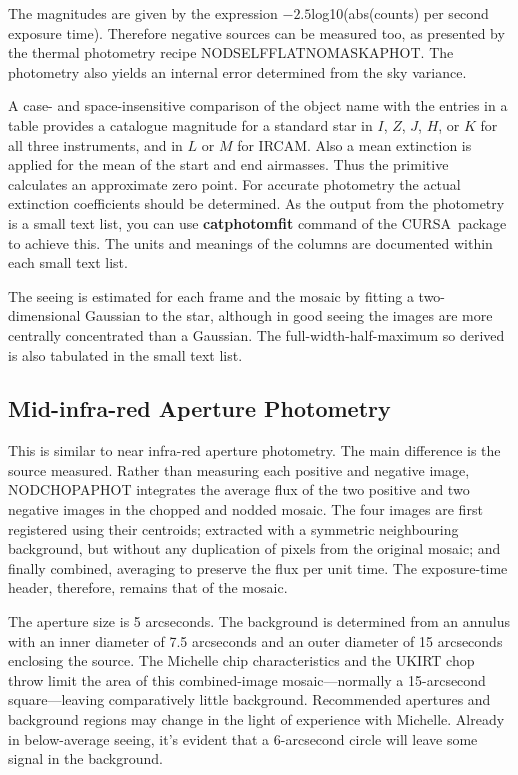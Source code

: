 \documentclass[twoside,11pt]{article}
\newcommand{\htmlref}[2]{#1}
\newcommand{\xref}[3]{#1}
\newcommand{\xlabel}[1]{}
\renewcommand{\_}{\texttt{\symbol{95}}}
\newcommand{\lsk}{\raisebox{-0.4ex}{\rm *}}
\newcommand{\CURSA}{{\footnotesize CURSA}}
\begin{document}
The magnitudes are given by the expression $-2.5 $\lsk$
$log10(abs(counts) per second exposure time).  Therefore negative
sources can be measured too, as presented by the thermal photometry
recipe \htmlref{NOD\_SELF\_FLAT\_NO\_MASK\_APHOT}{NOD\_SELF\_FLAT\_NO\_MASK\_APHOT}.
The photometry also yields an internal error determined from
the sky variance.

A case- and space-insensitive comparison of the object name with the
entries in a table provides a catalogue magnitude for a standard star
in $I$, $Z$, $J$, $H$, or $K$ for all three instruments, and in $L$ or $M$
for IRCAM.  Also a mean extinction is applied for the mean
of the start and end airmasses.  Thus the primitive calculates an
approximate zero point.  For accurate photometry the actual extinction
coefficients should be determined.  As the output from the photometry
is a \xref{small text list}{sun190}{STLREF}, you can use
\xref{{\bf catphotomfit} command}{sun190}{PHOTCAL} of the \CURSA\ package
to achieve this.  The units and meanings of the columns are documented
within each small text list.

The seeing is estimated for each frame and the mosaic by fitting a
two-dimensional Gaussian to the star, although in good seeing the
images are more centrally concentrated than a Gaussian.  The
full-width-half-maximum so derived is also tabulated in the small text
list.

\subsection{\xlabel{mid-infra-red_aperture_photometry}Mid-infra-red Aperture
Photometry\label{mid-infra-red_aperture_photometry}}

This is similar to \htmlref{near infra-red aperture
photometry}{near_infra-red_aperture_photometry}.  The main difference
is the source measured.  Rather than measuring each positive and
negative image, \htmlref{NOD\_CHOP\_APHOT}{NOD\_CHOP\_APHOT}
integrates the average flux of the two positive and two negative
images in the chopped and nodded mosaic.  The four images are first
registered using their centroids; extracted with a symmetric
neighbouring background, but without any duplication of pixels from
the original mosaic; and finally combined, averaging to preserve the
flux per unit time.  The exposure-time header, therefore, remains that
of the mosaic.

The aperture size is 5 arcseconds.  The background is determined
from an annulus with an inner diameter of 7.5 arcseconds and an
outer diameter of 15 arcseconds enclosing the source.  The Michelle chip
characteristics and the UKIRT chop throw limit the area of this
combined-image mosaic---normally a 15-arcsecond square---leaving
comparatively little background.  Recommended apertures and background
regions may change in the light of experience with Michelle.  Already
in below-average seeing, it's evident that a 6-arcsecond circle will
leave some signal in the background.
\end{document}
